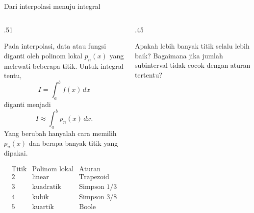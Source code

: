 \documentclass[aspectratio=169,10pt]{beamer}
\begin{document}
\begin{frame}{Dari interpolasi menuju integral}
\scriptsize
\begin{columns}[T,totalwidth=\textwidth]
\begin{column}{.51\textwidth}
\begin{bluebox}[Gagasan]
Pada interpolasi, data atau fungsi diganti oleh polinom lokal $p_n(x)$ yang melewati beberapa titik.
Untuk integral tentu,
\[
I=\int_a^b f(x)\,dx
\]
diganti menjadi
\[
I\approx \int_a^b p_n(x)\,dx.
\]
Yang berubah hanyalah cara memilih $p_n(x)$ dan berapa banyak titik yang dipakai.
\end{bluebox}
\begin{greenbox}
\[
\begin{array}{c|c|c}
\text{Titik} & \text{Polinom lokal} & \text{Aturan}\\\hline
2 & \text{linear} & \text{Trapezoid}\\
3 & \text{kuadratik} & \text{Simpson }1/3\\
4 & \text{kubik} & \text{Simpson }3/8\\
5 & \text{kuartik} & \text{Boole}
\end{array}
\]
\end{greenbox}
\end{column}
\begin{column}{.45\textwidth}
\begin{orangebox}
Apakah lebih banyak titik selalu lebih baik? Bagaimana jika jumlah subinterval tidak cocok dengan aturan tertentu?
\end{orangebox}
\end{column}
\end{columns}
\end{frame}
\end{document}
